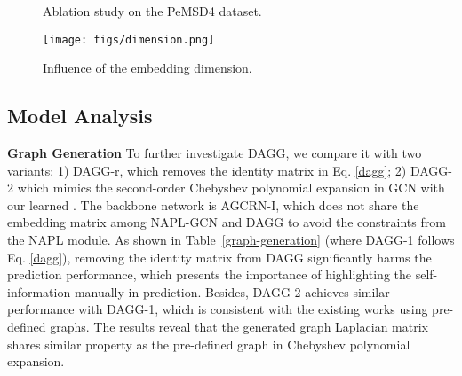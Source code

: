\documentclass{article}
\begin{document}
\begin{figure}[h]
    \begin{minipage}[t]{0.65\linewidth}
    \vspace{0pt}
    \centering
    \caption{Ablation study on the PeMSD4 dataset.}
    \label{ablation} 
    \end{minipage}
    \begin{minipage}[t]{0.34\linewidth}
    \vspace{6pt}
    \centering
    \texttt{[image: figs/dimension.png]}
    \vspace{-0.5cm}
    \caption{Influence of the embedding dimension.}
    \label{dimension}
    \end{minipage}
\end{figure}

\subsection{Model Analysis} \label{model_analysis}
\textbf{Graph Generation} To further investigate DAGG, we compare it with two variants: 1) DAGG-r, which removes the identity matrix in Eq. \ref{dagg}; 2) DAGG-2 which mimics the second-order Chebyshev polynomial expansion in GCN \cite{stgcn,kipf-gcn} with our learned . The backbone network is AGCRN-I, which does not share the embedding matrix among NAPL-GCN and DAGG to avoid the constraints from the NAPL module. As shown in Table~\ref{graph-generation} (where DAGG-1 follows Eq. \ref{dagg}), removing the identity matrix from DAGG significantly harms the prediction performance, which presents the importance of highlighting the self-information manually in prediction. Besides, DAGG-2 achieves similar performance with DAGG-1, which is consistent with the existing works \cite{kipf-gcn,stgcn,DCRNN} using pre-defined graphs. The results reveal that the generated graph Laplacian matrix  shares similar property as the pre-defined graph in Chebyshev polynomial expansion.
\end{document}
